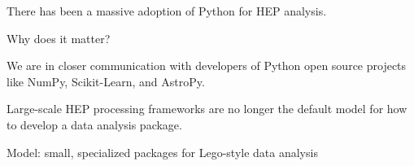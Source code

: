 \documentclass[aspectratio=169]{beamer}
\begin{document}
\begin{frame}{There has been a massive adoption of Python for HEP analysis.}
\large
\vspace{0.35 cm}

{\Large Why does it matter?}

\vspace{0.5 cm}
We are in closer communication with developers of Python open source projects like NumPy, Scikit-Learn, and AstroPy.

\vspace{0.5 cm}
Large-scale HEP processing frameworks are no longer the default model for how to develop a data analysis package.
\end{frame}

\begin{frame}{Model: small, specialized packages for Lego-style data analysis}



\end{frame}
\end{document}
